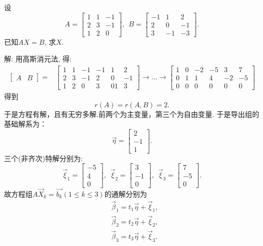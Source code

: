 \begin{eg}
设
\begin{displaymath}
A=\begin{bmatrix}1&1&-1\\2&3&-1\\1&2&0\end{bmatrix},\ \ B=\begin{bmatrix}-1&1&2\\2&0&-1\\3&-1&-3\end{bmatrix}.\end{displaymath}
已知$AX=B$, 求$X$.

解: 用高斯消元法, 得:
\begin{displaymath}\begin{aligned}
\begin{bmatrix}A&B\end{bmatrix}=&\begin{bmatrix}1&1&-1&-1&1&2\\2&3&-1&2&0&-1
\\1&2&0&3&01&3\end{bmatrix}\rightarrow\dots\rightarrow\begin{bmatrix}
1&0&-2&-5&3&7\\0&1&1&4&-2&-5\\0&0&0&0&0&0\end{bmatrix}\end{aligned}\end{displaymath}
得到$$r(A)=r(A,B)=2.$$于是方程有解，且有无穷多解.前两个为主变量，第三个为自由变量. 于是导出组的基础解系为：
$$\vec{\eta}=\begin{bmatrix}2\\-1\\1\end{bmatrix}.$$
三个(非齐次)特解分别为:
\begin{displaymath}
\vec{\xi}_1=\begin{bmatrix}-5\\4\\0\end{bmatrix},\ \ \vec{\xi}_2=\begin{bmatrix}3\\-1\\0\end{bmatrix},\ \ \vec{\xi}_3=\begin{bmatrix}7\\-5\\0\end{bmatrix}.
\end{displaymath}
故方程组$A\vec{X}_k=\vec{b_k}(1\leq k \leq 3)$的通解分别为
\begin{displaymath}\begin{aligned}
&\vec{\beta}_1=t_1\vec{\eta}+\vec{\xi}_1,\\
&\vec{\beta}_2=t_2\vec{\eta}+\vec{\xi}_2,\\
&\vec{\beta}_3=t_3\vec{\eta}+\vec{\xi}_3.\end{aligned}\end{displaymath}


\end{eg}
